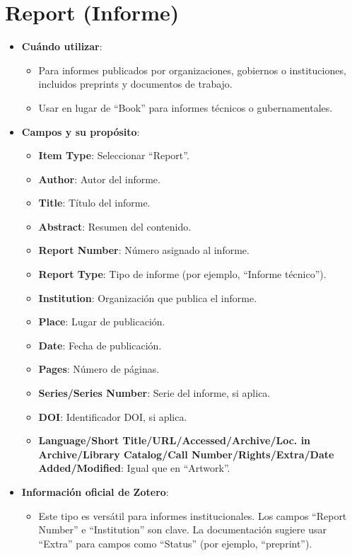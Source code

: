 \documentclass[
  jou,
  floatsintext,
  longtable,
  a4paper,
  nolmodern,
  notxfonts,
  notimes,
  12pt,
  colorlinks=true,linkcolor=blue,citecolor=blue,urlcolor=blue]{apa7}
\providecommand{\tightlist}{%
  \setlength{\itemsep}{0pt}\setlength{\parskip}{0pt}}
\begin{document}
\section{Report (Informe)}\label{report-informe}

\begin{itemize}
\tightlist
\item
  \textbf{Cuándo utilizar}:

  \begin{itemize}
  \tightlist
  \item
    Para informes publicados por organizaciones, gobiernos o
    instituciones, incluidos preprints y documentos de trabajo.
  \item
    Usar en lugar de ``Book'' para informes técnicos o gubernamentales.
  \end{itemize}
\item
  \textbf{Campos y su propósito}:

  \begin{itemize}
  \tightlist
  \item
    \textbf{Item Type}: Seleccionar ``Report''.
  \item
    \textbf{Author}: Autor del informe.
  \item
    \textbf{Title}: Título del informe.
  \item
    \textbf{Abstract}: Resumen del contenido.
  \item
    \textbf{Report Number}: Número asignado al informe.
  \item
    \textbf{Report Type}: Tipo de informe (por ejemplo, ``Informe
    técnico'').
  \item
    \textbf{Institution}: Organización que publica el informe.
  \item
    \textbf{Place}: Lugar de publicación.
  \item
    \textbf{Date}: Fecha de publicación.
  \item
    \textbf{Pages}: Número de páginas.
  \item
    \textbf{Series/Series Number}: Serie del informe, si aplica.
  \item
    \textbf{DOI}: Identificador DOI, si aplica.
  \item
    \textbf{Language/Short Title/URL/Accessed/Archive/Loc. in
    Archive/Library Catalog/Call Number/Rights/Extra/Date
    Added/Modified}: Igual que en ``Artwork''.
  \end{itemize}
\item
  \textbf{Información oficial de Zotero}:

  \begin{itemize}
  \tightlist
  \item
    Este tipo es versátil para informes institucionales. Los campos
    ``Report Number'' e ``Institution'' son clave. La documentación
    sugiere usar ``Extra'' para campos como ``Status'' (por ejemplo,
    ``preprint'').
  \end{itemize}
\end{itemize}
\end{document}
